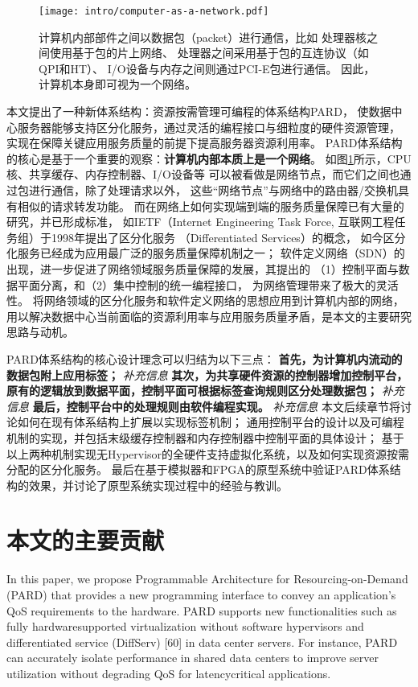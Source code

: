\begin{figure}[H]
  \centering
  \texttt{[image: intro/computer-as-a-network.pdf]}
  \caption[计算机内部本质是一个网络]{
    计算机内部部件之间以数据包（packet）进行通信，比如
    处理器核之间使用基于包的片上网络、
    处理器之间采用基于包的互连协议（如QPI和HT）、
    I/O设备与内存之间则通过PCI-E包进行通信。
    因此，计算机本身即可视为一个网络。}
  \label{fig:computer-as-a-network}
\end{figure}

本文提出了一种新体系结构：资源按需管理可编程的体系结构PARD\cite{pard2015}，
使数据中心服务器能够支持区分化服务，通过灵活的编程接口与细粒度的硬件资源管理，
实现在保障关键应用服务质量的前提下提高服务器资源利用率。
PARD体系结构的核心是基于一个重要的观察：\textbf{计算机内部本质上是一个网络}。
如图\ref{fig:computer-as-a-network}所示，CPU核、共享缓存、内存控制器、I/O设备等
可以被看做是网络节点，而它们之间也通过包进行通信，除了处理请求以外，
这些“网络节点”与网络中的路由器/交换机具有相似的请求转发功能。
而在网络上如何实现端到端的服务质量保障已有大量的研究，并已形成标准，
如IETF（Internet Engineering Task Force, 互联网工程任务组）于1998年提出了区分化服务
（Differentiated Services）\cite{}的概念，
如今区分化服务已经成为应用最广泛的服务质量保障机制之一；
软件定义网络（SDN）的出现，进一步促进了网络领域服务质量保障的发展，其提出的
（1）控制平面与数据平面分离，和（2）集中控制的统一编程接口，
为网络管理带来了极大的灵活性。
将网络领域的区分化服务和软件定义网络的思想应用到计算机内部的网络，
用以解决数据中心当前面临的资源利用率与应用服务质量矛盾，是本文的主要研究思路与动机。

PARD体系结构的核心设计理念可以归结为以下三点：
\textbf{首先，为计算机内流动的数据包附上应用标签；} \emph{补充信息}
\textbf{其次，为共享硬件资源的控制器增加控制平台，原有的逻辑放到数据平面，控制平面可根据标签查询规则区分处理数据包；} \emph{补充信息}
\textbf{最后，控制平台中的处理规则由软件编程实现。} \emph{补充信息}
本文后续章节将讨论如何在现有体系结构上扩展以实现标签机制；
通用控制平台的设计以及可编程机制的实现，并包括末级缓存控制器和内存控制器中控制平面的具体设计；
基于以上两种机制实现无Hypervisor的全硬件支持虚拟化系统，以及如何实现资源按需分配的区分化服务。
最后在基于模拟器和FPGA的原型系统中验证PARD体系结构的效果，并讨论了原型系统实现过程中的经验与教训。


\section{本文的主要贡献}
In this paper, we propose Programmable Architecture for
Resourcing-on-Demand (PARD) that provides a new programming
interface to convey an application’s QoS requirements to the hardware.
PARD supports new functionalities such as fully hardwaresupported
virtualization without software hypervisors and differentiated
service (DiffServ) [60] in data center servers. For instance,
PARD can accurately isolate performance in shared data centers
to improve server utilization without degrading QoS for latencycritical
applications.


